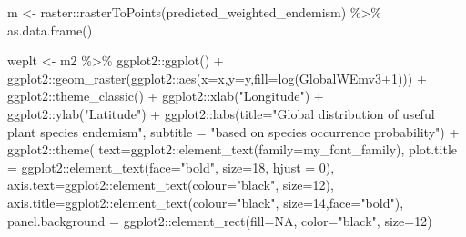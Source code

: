 \documentclass[
]{article}
\newenvironment{Shaded}{\begin{snugshade}}{\end{snugshade}}
\newcommand{\AttributeTok}[1]{\textcolor[rgb]{0.77,0.63,0.00}{#1}}
\newcommand{\ConstantTok}[1]{\textcolor[rgb]{0.00,0.00,0.00}{#1}}
\newcommand{\DecValTok}[1]{\textcolor[rgb]{0.00,0.00,0.81}{#1}}
\newcommand{\FunctionTok}[1]{\textcolor[rgb]{0.00,0.00,0.00}{#1}}
\newcommand{\NormalTok}[1]{#1}
\newcommand{\OtherTok}[1]{\textcolor[rgb]{0.56,0.35,0.01}{#1}}
\newcommand{\SpecialCharTok}[1]{\textcolor[rgb]{0.00,0.00,0.00}{#1}}
\newcommand{\StringTok}[1]{\textcolor[rgb]{0.31,0.60,0.02}{#1}}
\begin{document}
\begin{Shaded}
\begin{Highlighting}[]

\NormalTok{m }\OtherTok{\textless{}{-}}\NormalTok{ raster}\SpecialCharTok{::}\FunctionTok{rasterToPoints}\NormalTok{(predicted\_weighted\_endemism) }\SpecialCharTok{\%\textgreater{}\%}
  \FunctionTok{as.data.frame}\NormalTok{()}

\NormalTok{weplt }\OtherTok{\textless{}{-}}\NormalTok{ m2 }\SpecialCharTok{\%\textgreater{}\%}
\NormalTok{  ggplot2}\SpecialCharTok{::}\FunctionTok{ggplot}\NormalTok{() }\SpecialCharTok{+}
\NormalTok{  ggplot2}\SpecialCharTok{::}\FunctionTok{geom\_raster}\NormalTok{(ggplot2}\SpecialCharTok{::}\FunctionTok{aes}\NormalTok{(}\AttributeTok{x=}\NormalTok{x,}\AttributeTok{y=}\NormalTok{y,}\AttributeTok{fill=}\FunctionTok{log}\NormalTok{(GlobalWEmv3}\SpecialCharTok{+}\DecValTok{1}\NormalTok{))) }\SpecialCharTok{+}
\NormalTok{  ggplot2}\SpecialCharTok{::}\FunctionTok{theme\_classic}\NormalTok{() }\SpecialCharTok{+}
\NormalTok{  ggplot2}\SpecialCharTok{::}\FunctionTok{xlab}\NormalTok{(}\StringTok{"Longitude"}\NormalTok{) }\SpecialCharTok{+}\NormalTok{ ggplot2}\SpecialCharTok{::}\FunctionTok{ylab}\NormalTok{(}\StringTok{"Latitude"}\NormalTok{) }\SpecialCharTok{+}
\NormalTok{  ggplot2}\SpecialCharTok{::}\FunctionTok{labs}\NormalTok{(}\AttributeTok{title=}\StringTok{"Global distribution of useful plant species endemism"}\NormalTok{,}
                \AttributeTok{subtitle =} \StringTok{"based on species occurrence probability"}\NormalTok{) }\SpecialCharTok{+}
\NormalTok{  ggplot2}\SpecialCharTok{::}\FunctionTok{theme}\NormalTok{(}
    \AttributeTok{text=}\NormalTok{ggplot2}\SpecialCharTok{::}\FunctionTok{element\_text}\NormalTok{(}\AttributeTok{family=}\NormalTok{my\_font\_family),}
    \AttributeTok{plot.title =}\NormalTok{ ggplot2}\SpecialCharTok{::}\FunctionTok{element\_text}\NormalTok{(}\AttributeTok{face=}\StringTok{"bold"}\NormalTok{, }\AttributeTok{size=}\DecValTok{18}\NormalTok{, }\AttributeTok{hjust =} \DecValTok{0}\NormalTok{),}
    \AttributeTok{axis.text=}\NormalTok{ggplot2}\SpecialCharTok{::}\FunctionTok{element\_text}\NormalTok{(}\AttributeTok{colour=}\StringTok{"black"}\NormalTok{, }\AttributeTok{size=}\DecValTok{12}\NormalTok{),}
    \AttributeTok{axis.title=}\NormalTok{ggplot2}\SpecialCharTok{::}\FunctionTok{element\_text}\NormalTok{(}\AttributeTok{colour=}\StringTok{"black"}\NormalTok{, }\AttributeTok{size=}\DecValTok{14}\NormalTok{,}\AttributeTok{face=}\StringTok{"bold"}\NormalTok{),}
    \AttributeTok{panel.background =}\NormalTok{ ggplot2}\SpecialCharTok{::}\FunctionTok{element\_rect}\NormalTok{(}\AttributeTok{fill=}\ConstantTok{NA}\NormalTok{, }\AttributeTok{color=}\StringTok{"black"}\NormalTok{, }\AttributeTok{size=}\DecValTok{12}\NormalTok{)}

\end{Highlighting}
\end{Shaded}
\end{document}
